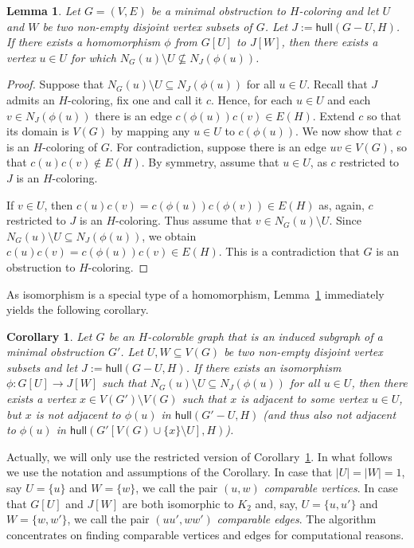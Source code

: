 \documentclass[11pt,a4paper]{article}
\theoremstyle{mystyle}
\newtheorem{lemma}[theorem]{Lemma}
\newtheorem{corollary}[theorem]{Corollary}
\newcommand{\hull}{\mathsf{hull}}
\begin{document}
\begin{lemma}
\label{similarGraphsLemma}
Let $G=(V,E)$ be a minimal obstruction to $H$-coloring and let $U$ and $W$ be two non-empty disjoint vertex subsets of $G$.
Let $J := \hull(G-U,H)$.
If there exists a homomorphism $\phi$ from $G[U]$ to $J[W]$, then there exists a vertex $u \in U$ for which $N_G(u) \setminus U \nsubseteq N_J(\phi(u))$.
\end{lemma}
\begin{proof}
Suppose that $N_G(u)\setminus U \subseteq N_J(\phi(u))$ for all $u \in U$.
Recall that $J$ admits an $H$-coloring, fix one and call it $c$.
Hence, for each $u \in U$ and each $v \in N_J(\phi(u))$ there is an edge $c(\phi(u))c(v) \in E(H)$.
Extend $c$ so that its domain is $V(G)$ by mapping any $u \in U$ to $c(\phi(u))$.
We now show that $c$ is an $H$-coloring of $G$. For contradiction, suppose there is an edge $uv \in V(G)$,
so that $c(u)c(v) \notin E(H)$. By symmetry, assume that $u \in U$, as $c$ restricted to $J$ is an $H$-coloring.

If $v \in U$, then $c(u)c(v) = c(\phi(u))c(\phi(v)) \in E(H)$ as, again, $c$ restricted to $J$ is an $H$-coloring.
Thus assume that $v \in N_G(u)\setminus U$.
Since $N_G(u)\setminus U \subseteq N_J(\phi(u))$, we obtain $c(u)c(v) = c(\phi(u))c(v) \in E(H)$.
This is a contradiction that $G$ is an obstruction to $H$-coloring.
\end{proof}

As isomorphism is a special type of a homomorphism, Lemma~\ref{similarGraphsLemma} immediately yields the following corollary.

\begin{corollary}\label{cor:comparableGraphs}
Let $G$ be an $H$-colorable graph that is an induced subgraph of a minimal obstruction $G'$.
Let $U, W \subseteq V(G)$ be two non-empty disjoint vertex subsets and let $J := \hull(G-U,H)$.
If there exists an isomorphism  $\phi : G[U] \rightarrow J[W]$ such that $N_G(u) \setminus U \subseteq N_J(\phi(u))$ for all $u \in U$, then there exists a vertex $x \in V(G') \setminus V(G)$ such that $x$ is adjacent to some vertex $u \in U$, but $x$ is not adjacent to $\phi(u)$ in $\hull(G'-U,H)$ (and thus also not adjacent to $\phi(u)$ in $\hull(G'[V(G) \cup \{x\} \setminus U],H)$).
\end{corollary}

Actually, we will only use the restricted version of Corollary~\ref{cor:comparableGraphs}. In what follows we use the notation and assumptions of the Corollary.
In case that $|U|=|W|=1$, say $U = \{u\}$ and $W = \{w\}$, we call the pair $(u,w)$ \textit{comparable vertices}.
In case that $G[U]$ and $J[W]$ are both isomorphic to $K_2$ and, say, $U = \{u,u'\}$ and $W = \{w,w'\}$,
we call the pair $(uu',ww')$ \textit{comparable edges}.
The algorithm concentrates on finding comparable vertices and edges for computational reasons.
\end{document}
